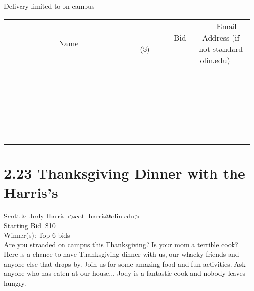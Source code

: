 \documentclass[11pt]{article}
\begin{document}
Delivery limited to on-campus \\
					[6ex]
					\begin{tabular}{c c c}
						~~~~~~~~~~~~~Name~~~~~~~~~~~~~ & ~~~~~~~~~Bid (\$)~~~~~~~~~ & ~~~Email Address (if not standard olin.edu)~~~ \\
				
 & & \\
\hline
 & & \\
\hline
 & & \\
\hline
 & & \\
\hline
 & & \\
\hline
 & & \\
\hline
 & & \\
\hline
 & & \\
\hline
 & & \\
\hline
 & & \\
\hline
 & & \\
\hline
 & & \\
\hline
 & & \\
\hline
 & & \\
\hline
 & & \\
\hline
 & & \\
\hline
 & & \\
\hline
 & & \\
\hline
 & & \\
\hline
 & & \\
\hline
 & & \\
\hline
 & & \\
\hline
 & & \\
\hline
 & & \\
\hline
 & & \\
\hline
 & & \\
\hline
					\end{tabular}
					\clearpage
				
					\section*{2.23 Thanksgiving Dinner with the Harris's}
					Scott \& Jody Harris <scott.harris@olin.edu> \\
					Starting Bid: \$10 \\
					Winner(s): Top 6 bids \\
					Are you stranded on campus this Thanksgiving? Is your mom a terrible cook? Here is a chance to have Thanksgiving dinner with us, our whacky friends and anyone else that drops by. Join us for some amazing food and fun activities. Ask anyone who has eaten at our house... Jody is a fantastic cook and nobody leaves hungry.
\end{document}
